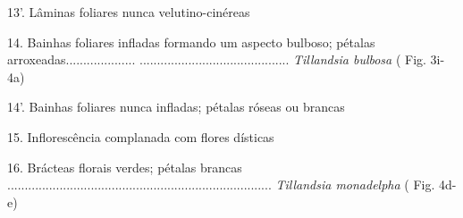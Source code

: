 \begin{customList1}
\begin{customList1}
\begin{customList1}
\begin{customList1}
\begin{customList1}
\item \par{}13'.\allowbreak{} Lâminas foliares nunca velutino-\allowbreak{}cinéreas
\begin{customList1}
\item \par{}14.\allowbreak{} Bainhas foliares infladas formando um aspecto bulboso; pétalas arroxeadas.\allowbreak{}.\allowbreak{}.\allowbreak{}.\allowbreak{}.\allowbreak{}.\allowbreak{}.\allowbreak{}.\allowbreak{}.\allowbreak{}.\allowbreak{}.\allowbreak{}.\allowbreak{}.\allowbreak{}.\allowbreak{}.\allowbreak{}.\allowbreak{}.\allowbreak{}.\allowbreak{}.\allowbreak{}.\allowbreak{} .\allowbreak{}.\allowbreak{}.\allowbreak{}.\allowbreak{}.\allowbreak{}.\allowbreak{}.\allowbreak{}.\allowbreak{}.\allowbreak{}.\allowbreak{}.\allowbreak{}.\allowbreak{}.\allowbreak{}.\allowbreak{}.\allowbreak{}.\allowbreak{}.\allowbreak{}.\allowbreak{}.\allowbreak{}.\allowbreak{}.\allowbreak{}.\allowbreak{}.\allowbreak{}.\allowbreak{}.\allowbreak{}.\allowbreak{}.\allowbreak{}.\allowbreak{}.\allowbreak{}.\allowbreak{}.\allowbreak{}.\allowbreak{}.\allowbreak{}.\allowbreak{}.\allowbreak{}.\allowbreak{}.\allowbreak{}.\allowbreak{}.\allowbreak{}.\allowbreak{}.\allowbreak{}.\allowbreak{}.\allowbreak{} \textit{Tillandsia bulbosa} (\allowbreak{} Fig.\allowbreak{} 3i-\allowbreak{} 4a)\allowbreak{}
\item \par{}14'.\allowbreak{} Bainhas foliares nunca infladas; pétalas róseas ou brancas
\begin{customList1}
\item \par{}15.\allowbreak{} Inflorescência complanada com flores dísticas
\begin{customList1}
\item \par{}16.\allowbreak{} Brácteas florais verdes; pétalas brancas .\allowbreak{}.\allowbreak{}.\allowbreak{}.\allowbreak{}.\allowbreak{}.\allowbreak{}.\allowbreak{}.\allowbreak{}.\allowbreak{}.\allowbreak{}.\allowbreak{}.\allowbreak{}.\allowbreak{}.\allowbreak{}.\allowbreak{}.\allowbreak{}.\allowbreak{}.\allowbreak{}.\allowbreak{}.\allowbreak{}.\allowbreak{}.\allowbreak{}.\allowbreak{}.\allowbreak{}.\allowbreak{}.\allowbreak{}.\allowbreak{}.\allowbreak{}.\allowbreak{}.\allowbreak{}.\allowbreak{}.\allowbreak{}.\allowbreak{}.\allowbreak{}.\allowbreak{}.\allowbreak{}.\allowbreak{}.\allowbreak{}.\allowbreak{}.\allowbreak{}.\allowbreak{}.\allowbreak{}.\allowbreak{}.\allowbreak{}.\allowbreak{}.\allowbreak{}.\allowbreak{}.\allowbreak{}.\allowbreak{}.\allowbreak{}.\allowbreak{}.\allowbreak{}.\allowbreak{}.\allowbreak{}.\allowbreak{}.\allowbreak{}.\allowbreak{}.\allowbreak{}.\allowbreak{}.\allowbreak{}.\allowbreak{}.\allowbreak{}.\allowbreak{}.\allowbreak{}.\allowbreak{}.\allowbreak{}.\allowbreak{}.\allowbreak{}.\allowbreak{}.\allowbreak{}.\allowbreak{}.\allowbreak{}.\allowbreak{}.\allowbreak{}.\allowbreak{}.\allowbreak{} \textit{Tillandsia monadelpha} (\allowbreak{} Fig.\allowbreak{} 4d-\allowbreak{}e)\allowbreak{}

\end{customList1}
\end{customList1}
\end{customList1}
\end{customList1}
\end{customList1}
\end{customList1}
\end{customList1}
\end{customList1}
